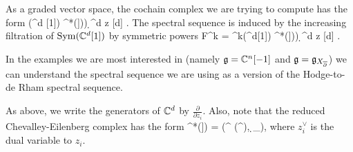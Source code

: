 As a graded vector space, the cochain complex we are trying to compute has the form
\ben
\Sym(\CC^d [1]) \tensor \cred^*\left(\fg[[z_1,\ldots,z_d]])\right) \d^d z [d] .
\een
The spectral sequence is induced by the increasing filtration of ${\rm Sym}(\mathbb C^d [1])$ by symmetric powers
\ben
F^k = \Sym^{\leq k}(\CC^d[1]) \tensor \cred^*\left(\fg[[z_1,\ldots,z_d]])\right) \d^d z [d] .
\een

\begin{rmk}
In the examples we are most interested in (namely $\mathfrak g = \mathbb C^n[-1]$ and $\mathfrak g = \mathfrak g_{X_{\overline{\partial}}}$) we can understand the spectral sequence we are using as a version of the Hodge-to-de Rham spectral sequence.
\end{rmk}

As above, we write the generators of $\mathbb C^d$ by $\frac{\partial}{\partial z_i}$. 
Also, note that the reduced Chevalley-Eilenberg complex has the form
\ben
\cred^*(\fg[[z_1,\ldots,z_n]]) = \left(\Sym^{} \left(\fg^ \right), \d_{\fg}\right),
\een
where $z_i^\vee$ is the dual variable to $z_i$. 

